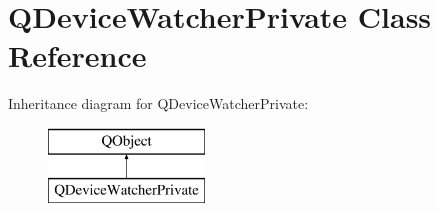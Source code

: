 \hypertarget{class_q_device_watcher_private}{}\section{Q\+Device\+Watcher\+Private Class Reference}
\label{class_q_device_watcher_private}
Inheritance diagram for Q\+Device\+Watcher\+Private\+:\begin{figure}[H]
\begin{center}
\leavevmode
\includegraphics[height=2.000000cm]{class_q_device_watcher_private}
\end{center}
\end{figure}
